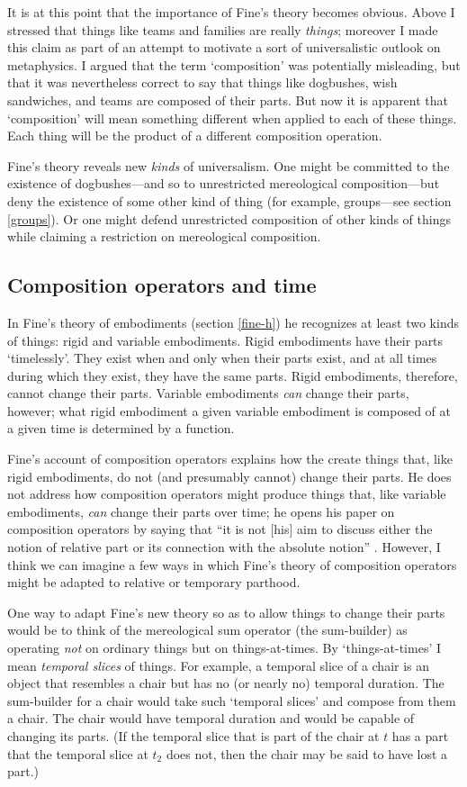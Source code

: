 \documentclass[11pt]{article}
\begin{document}
\begin{spacing}{1.5}
It is at this point that the importance of Fine's theory becomes
obvious.  Above I stressed that things like teams and families are
really {\em things}; moreover I made this claim as part of an attempt
to motivate a sort of universalistic outlook on metaphysics.  I argued
that the term `composition' was potentially misleading, but that it
was nevertheless correct to say that things like dogbushes, wish
sandwiches, and teams are composed of their parts.  But now it is
apparent that `composition' will mean something different when applied
to each of these things.  Each thing will be the product of a
different composition operation.

Fine's theory reveals new {\em kinds} of universalism.  One might be
committed to the existence of dogbushes---and so to unrestricted
mereological composition---but deny the existence of some other kind
of thing (for example, groups---see section \ref{groups}).  Or one
might defend unrestricted composition of other kinds of things while
claiming a restriction on mereological composition.

\subsection{Composition operators and time}
\label{c-change}
In Fine's theory of embodiments (section \ref{fine-h}) he recognizes
at least two kinds of things: rigid and variable embodiments.  Rigid
embodiments have their parts `timelessly'.  They exist when and only
when their parts exist, and at all times during which they exist, they
have the same parts.  Rigid embodiments, therefore, cannot change
their parts.  Variable embodiments {\em can} change their parts,
however; what rigid embodiment a given variable embodiment is composed
of at a given time is determined by a function.

Fine's account of composition operators explains how the create things
that, like rigid embodiments, do not (and presumably cannot) change
their parts.  He does not address how composition operators might
produce things that, like variable embodiments, {\em can} change their
parts over time; he opens his paper on composition operators by saying
that ``it is not [his] aim to discuss either the notion of relative
part or its connection with the absolute notion''
\citeyearpar[559]{fine2010}.  However, I think we can imagine a few
ways in which Fine's theory of composition operators might be adapted
to relative or temporary parthood.

One way to adapt Fine's new theory so as to allow things to change
their parts would be to think of the mereological sum operator (the
sum-builder) as operating {\em not} on ordinary things but on
things-at-times.  By `things-at-times' I mean {\em temporal slices} of
things.  For example, a temporal slice of a chair is an object that
resembles a chair but has no (or nearly no) temporal duration.  The
sum-builder for a chair would take such `temporal slices' and compose
from them a chair.  The chair would have temporal duration and would
be capable of changing its parts.  (If the temporal slice that is part
of the chair at $t$ has a part that the temporal slice at $t_2$ does
not, then the chair may be said to have lost a part.)


\end{spacing}
\end{document}
